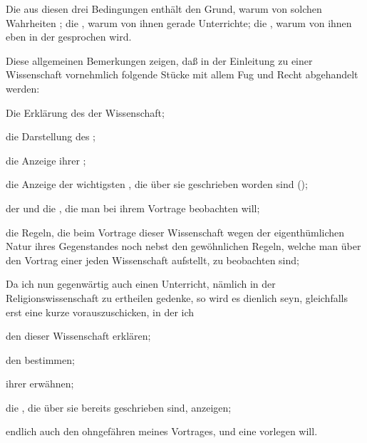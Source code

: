 Die  aus diesen drei Bedingungen enthält den Grund, warum von solchen Wahrheiten ; die , warum von ihnen gerade  Unterrichte; die , warum von ihnen eben in der  gesprochen wird.\par
Diese allgemeinen Bemerkungen zeigen, daß in der Einleitung zu einer Wissenschaft vornehmlich folgende Stücke mit allem Fug und Recht abgehandelt werden:
\begin{aufza}[a)]
\item Die Erklärung des  der Wissenschaft;
\item die Darstellung des ;
\item die Anzeige ihrer ;
\item die Anzeige der wichtigsten , die über sie geschrieben worden sind ();
\item der  und die , die man bei ihrem Vortrage beobachten will;
\item die Regeln, die beim Vortrage dieser Wissenschaft wegen der eigenthümlichen Natur ihres Gegenstandes noch nebst den gewöhnlichen Regeln, welche man über den Vortrag einer jeden Wissenschaft aufstellt, zu beobachten sind; \uam~
\end{aufza}\par
Da ich nun gegenwärtig auch einen Unterricht, nämlich in der Religionswissenschaft zu ertheilen gedenke, so wird es dienlich seyn, gleichfalls erst eine kurze  vorauszuschicken, in der ich
\begin{aufza}[a)]
\item den  dieser Wissenschaft erklären;
\item den  bestimmen;
\item ihrer  erwähnen;
\item die , die über sie bereits geschrieben sind, anzeigen;
\item endlich auch den ohngefähren  meines Vortrages, und eine  vorlegen will.
\end{aufza}
